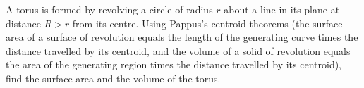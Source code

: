 A torus is formed by revolving a circle of radius $r$ about a line in its plane at distance $R>r$ from its centre. Using Pappus's centroid theorems (the surface area of a surface of revolution equals the length of the generating curve times the distance travelled by its centroid, and the volume of a solid of revolution equals the area of the generating region times the distance travelled by its centroid), find the surface area and the volume of the torus.
